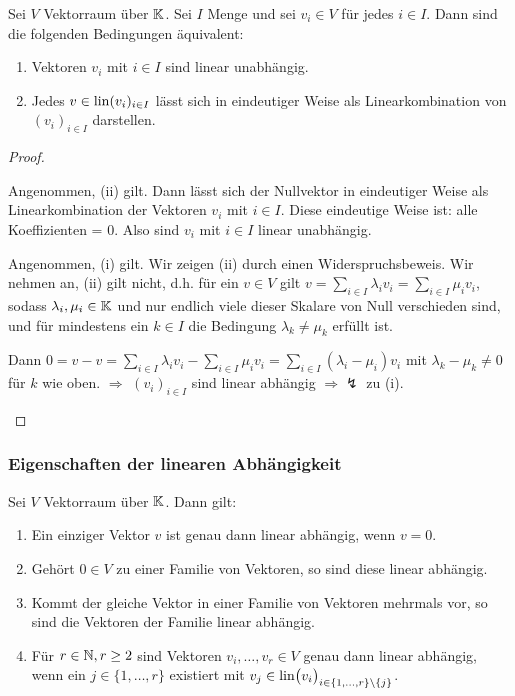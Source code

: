 \begin{thm}
	Sei $ V $ Vektorraum über $ \mathbb K $. Sei $ I $ Menge und sei $ v_i \in V $ für jedes $ i \in I $. Dann sind die folgenden Bedingungen äquivalent:
	\begin{enumerate}
		\item Vektoren  $ v_i $ mit $ i \in I $ sind linear unabhängig.
		\item Jedes $ v \in \operatorname{lin}(v_i)_{i \in I} $ lässt sich in eindeutiger Weise als Linearkombination von $ (v_i)_{i \in I} $ darstellen.
	\end{enumerate}
\end{thm}
\begin{proof}\
\begin{description}[font=\normalfont]
	\item[(ii) $ \Rightarrow $ (i):]
	Angenommen, (ii) gilt. Dann lässt sich der Nullvektor in eindeutiger Weise als Linearkombination der Vektoren $ v_i $ mit $ i \in I $. Diese eindeutige Weise ist: alle Koeffizienten = 0. Also sind $ v_i $ mit $ i \in I $ linear unabhängig.

	\item[(i) $ \Rightarrow $ (ii):]
	Angenommen, (i) gilt. Wir zeigen (ii) durch einen Widerspruchsbeweis. Wir nehmen an, (ii) gilt nicht, d.h. für ein $ v \in V $ gilt $ v = \sum_{i \in I} \lambda_iv_i = \sum_{i \in I} \mu_iv_i $, sodass $ \lambda_i, \mu_i \in \mathbb K $ und nur endlich viele dieser Skalare von Null verschieden sind, und für mindestens ein $ k \in I $ die Bedingung $ \lambda_k \neq \mu_k $ erfüllt ist.

	Dann $ 0 = v - v = \sum_{i \in I} \lambda_iv_i - \sum_{i \in I} \mu_iv_i = \sum_{i \in I} (\lambda_i - \mu_i)v_i $ mit $ \lambda_k - \mu_k \neq 0 $ für $ k $ wie oben. $ \Rightarrow $ $ (v_i)_{i \in I} $ sind linear abhängig $ \Rightarrow \lightning $ zu (i). \qedhere
\end{description}
\end{proof}

\subsubsection{Eigenschaften der linearen Abhängigkeit}

\begin{propn}
	Sei $ V $ Vektorraum über $ \mathbb K $. Dann gilt:
	\begin{enumerate}
		\item Ein einziger Vektor $ v $ ist genau dann linear abhängig, wenn $ v = 0 $.
		\item Gehört $ 0 \in V $ zu einer Familie von Vektoren, so sind diese linear abhängig.
		\item Kommt der gleiche Vektor in einer Familie von Vektoren mehrmals vor, so sind die Vektoren der Familie linear abhängig. 
		\item Für $ r \in \mathbb N, r \geq 2 $ sind Vektoren $ v_i, \ldots, v_r \in V $ genau dann linear abhängig, wenn ein $ j \in \{ 1, \ldots, r \} $ existiert mit $ v_j \in \operatorname{lin} \bigl(v_i \bigr)_{i \in \{ 1, \ldots, r \} \setminus \{ j \} } $.
	\end{enumerate}
\end{propn}

